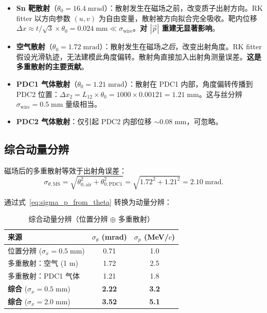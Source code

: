\documentclass[a4paper, 11pt]{article}
\begin{document}
\begin{itemize}[nosep]
  \item \textbf{Sn 靶散射}（$\theta_0 = 16.4\;\mathrm{mrad}$）：散射发生在磁场之前，改变质子出射方向。RK fitter 以方向参数 $(u, v)$ 为自由变量，散射被方向拟合完全吸收。靶内位移 $\Delta x \approx t/\sqrt{3} \times \theta_0 = 0.024\;\mathrm{mm} \ll \sigma_\mathrm{wire}$。\textbf{对 $|\vec{p}|$ 重建无显著影响}。

  \item \textbf{空气散射}（$\theta_0 = 1.72\;\mathrm{mrad}$）：散射发生在磁场\emph{之后}，改变出射角度。RK fitter 假设光滑轨迹，无法建模此角度偏转。散射角直接加入出射角测量误差。\textbf{这是多重散射的主要贡献}。

  \item \textbf{PDC1 气体散射}（$\theta_0 = 1.21\;\mathrm{mrad}$）：散射在 PDC1 内部，角度偏转传播到 PDC2 位置：$\Delta x_2 = L_{12} \times \theta_0 = 1000 \times 0.00121 = 1.21\;\mathrm{mm}$。这与丝分辨 $\sigma_\mathrm{wire} = 0.5\;\mathrm{mm}$ 量级相当。

  \item \textbf{PDC2 气体散射}：仅引起 PDC2 内部位移 $\sim 0.08\;\mathrm{mm}$，可忽略。
\end{itemize}

\subsection{综合动量分辨}

磁场后的多重散射等效于出射角误差：
\begin{equation}
  \sigma_{\theta,\mathrm{MS}} = \sqrt{\theta_{0,\mathrm{air}}^2 + \theta_{0,\mathrm{PDC1}}^2}
  = \sqrt{1.72^2 + 1.21^2} = 2.10\;\mathrm{mrad}.
\end{equation}

通过式~\eqref{eq:sigma_p_from_theta} 转换为动量分辨：

\begin{table}[H]
\centering
\caption{综合动量分辨（位置分辨 $\oplus$ 多重散射）}
\label{tab:combined_resolution}
\begin{tabular}{lcc}
\toprule
来源 & $\sigma_\theta$ (mrad) & $\sigma_p$ (MeV/$c$) \\
\midrule
位置分辨 ($\sigma_x = 0.5\;\mathrm{mm}$) & 0.71 & 1.0 \\
多重散射：空气 (1 m) & 1.72 & 2.5 \\
多重散射：PDC1 气体 & 1.21 & 1.8 \\
\midrule
\textbf{综合} ($\sigma_x = 0.5\;\mathrm{mm}$) & \textbf{2.22} & \textbf{3.2} \\
\textbf{综合} ($\sigma_x = 2.0\;\mathrm{mm}$) & \textbf{3.52} & \textbf{5.1} \\
\bottomrule
\end{tabular}
\end{table}
\end{document}
